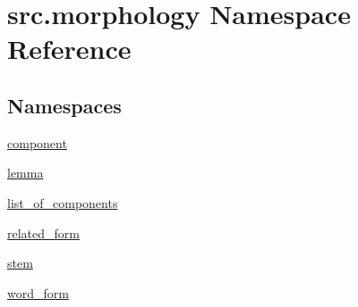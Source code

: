 \hypertarget{namespacesrc_1_1morphology}{\section{src.\+morphology Namespace Reference}
\label{namespacesrc_1_1morphology}
}
\subsection*{Namespaces}
\begin{DoxyCompactItemize}
\item 
 \hyperlink{namespacesrc_1_1morphology_1_1component}{component}
\item 
 \hyperlink{namespacesrc_1_1morphology_1_1lemma}{lemma}
\item 
 \hyperlink{namespacesrc_1_1morphology_1_1list__of__components}{list\+\_\+of\+\_\+components}
\item 
 \hyperlink{namespacesrc_1_1morphology_1_1related__form}{related\+\_\+form}
\item 
 \hyperlink{namespacesrc_1_1morphology_1_1stem}{stem}
\item 
 \hyperlink{namespacesrc_1_1morphology_1_1word__form}{word\+\_\+form}
\end{DoxyCompactItemize}
